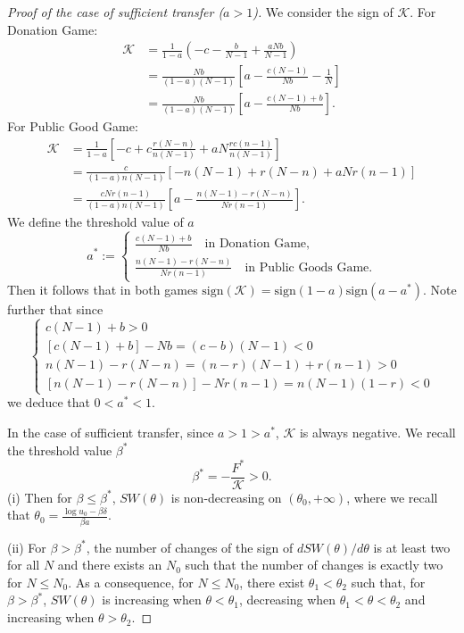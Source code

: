 \documentclass{article}
\begin{document}
\begin{proof}[Proof of the case of sufficient transfer ($a>1$)]
We consider the sign of $\mathcal{K}$. For Donation Game:
\begin{align*}
    \mathcal{K} &= \frac{1}{1-a}\left( -c-\frac{b}{N-1}+\frac{aNb}{N-1}\right) \\
    &= \frac{Nb}{(1-a)(N-1)}\left[ a -\frac{c(N-1)}{Nb} - \frac{1}{N} \right] \\
    &= \frac{Nb}{(1-a)(N-1)}\left[ a -\frac{c(N-1) + b}{Nb} \right].
\end{align*}
For Public Good Game:
\begin{align*}
    \mathcal{K} &= \frac{1}{1-a}\left[ -c +c\frac{r(N-n)}{n(N-1)}+aN\frac{rc(n-1)}{n(N-1)}
    \right] \\
    &= \frac{c}{(1-a)n(N-1)} \left[  -n(N-1) + r(N-n)+aNr(n-1)\right]\\
    &= \frac{cNr(n-1)}{(1-a)n(N-1)} \left[ a - \frac{n(N-1)-r(N-n)}{Nr(n-1)} \right].
\end{align*}
We define the threshold value of $a$
\begin{equation*}
a^*:=\begin{cases}
    \frac{c(N-1) + b}{Nb}\quad \text{in Donation Game},\\
    \frac{n(N-1)-r(N-n)}{Nr(n-1)}\quad \text{in Public Goods Game}.
\end{cases}
\end{equation*}
Then it follows that in both games $\textrm{sign}(\mathcal{K})=\textrm{sign}(1-a)\textrm{sign}(a-a^*)$. Note further that since \begin{equation*}
    \begin{cases}
        c(N-1)+b >0 \\
        [c(N-1)+b] - Nb = (c-b)(N-1)<0\\
        n(N-1) - r(N-n) = (n-r)(N-1)+r(n-1) > 0\\
        [n(N-1) - r(N-n)] - Nr(n-1) = n(N-1)(1-r) < 0
    \end{cases}
\end{equation*}
we deduce that $0 < a^* < 1$.

In the case of sufficient transfer, since $a > 1 > a^*$, $\mathcal{K}$ is always negative. We recall the threshold value $\beta^*$
\begin{equation*}
            \beta^* = -\frac{F^*}{\mathcal{K}}>0.
        \end{equation*}
(i) Then for $\beta \le \beta^*$, $SW(\theta)$ is non-decreasing on $(\theta_0, +\infty)$, where we recall that $\theta_0 = \frac{\log u_0 - \beta \delta}{\beta a}$.

(ii) For $\beta > \beta^*$, the number of changes of the sign of $dSW(\theta)/d\theta$ is at least two for all $N$ and there exists an $N_0$ such that the number of changes is exactly two for $N \le N_0$. As a consequence, for $N \le N_0$, there exist $\theta_1 < \theta_2$ such that, for $\beta > \beta^*$, $SW(\theta)$ is increasing when $\theta < \theta_1$, decreasing when $\theta_1 < \theta < \theta_2$ and increasing when $\theta > \theta_2$. 
\end{proof}
\end{document}
